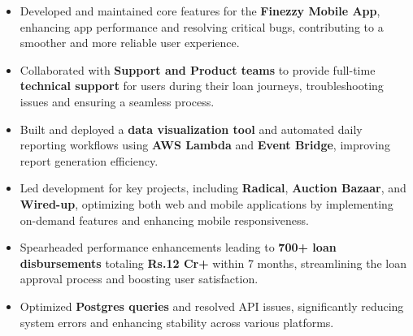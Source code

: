 \documentclass[]{deedy-resume-openfont}
\begin{document}
\begin{minipage}[t]{1.0\textwidth}


\begin{itemize}
    \item Developed and maintained core features for the \textbf{Finezzy Mobile App}, enhancing app performance and resolving critical bugs, contributing to a smoother and more reliable user experience.
    \item Collaborated with \textbf{Support and Product teams} to provide full-time \textbf{technical support} for users during their loan journeys, troubleshooting issues and ensuring a seamless process.
    \item Built and deployed a \textbf{data visualization tool} and automated daily reporting workflows using \textbf{AWS Lambda} and \textbf{Event Bridge}, improving report generation efficiency.
    \item Led development for key projects, including \textbf{Radical}, \textbf{Auction Bazaar}, and \textbf{Wired-up}, optimizing both web and mobile applications by implementing on-demand features and enhancing mobile responsiveness.
    \item Spearheaded performance enhancements leading to \textbf{700+ loan disbursements} totaling \textbf{Rs.12 Cr+} within 7 months, streamlining the loan approval process and boosting user satisfaction.
    \item Optimized \textbf{Postgres queries} and resolved API issues, significantly reducing system errors and enhancing stability across various platforms.
\end{itemize}

\sectionsep



\end{minipage}
\end{document}
